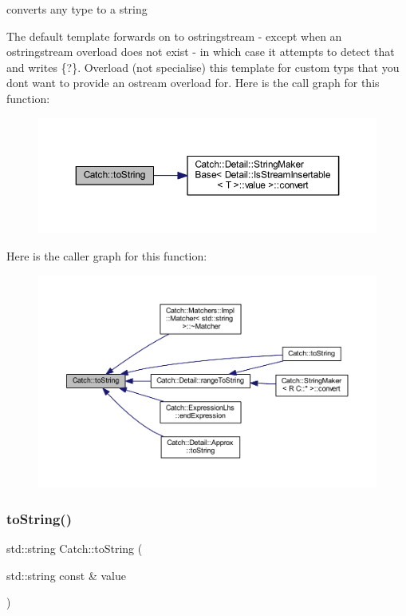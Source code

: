 converts any type to a string 

The default template forwards on to ostringstream -\/ except when an ostringstream overload does not exist -\/ in which case it attempts to detect that and writes \{?\}. Overload (not specialise) this template for custom typs that you don\textquotesingle{}t want to provide an ostream overload for. Here is the call graph for this function\+:\nopagebreak
\begin{figure}[H]
\begin{center}
\leavevmode
\includegraphics[width=350pt]{namespace_catch_adbd1730f961da94d9ed284f70fd7a28b_cgraph}
\end{center}
\end{figure}
Here is the caller graph for this function\+:\nopagebreak
\begin{figure}[H]
\begin{center}
\leavevmode
\includegraphics[width=350pt]{namespace_catch_adbd1730f961da94d9ed284f70fd7a28b_icgraph}
\end{center}
\end{figure}
\hypertarget{namespace_catch_ad6e969257437cf007b8b5017b22e570c}{}\label{namespace_catch_ad6e969257437cf007b8b5017b22e570c} 
\subsubsection{\texorpdfstring{to\+String()}{toString()}\hspace{0.1cm}{\footnotesize\ttfamily [2/17]}}
{\footnotesize\ttfamily std\+::string Catch\+::to\+String (\begin{DoxyParamCaption}\item[{std\+::string const \&}]{value }\end{DoxyParamCaption})}

